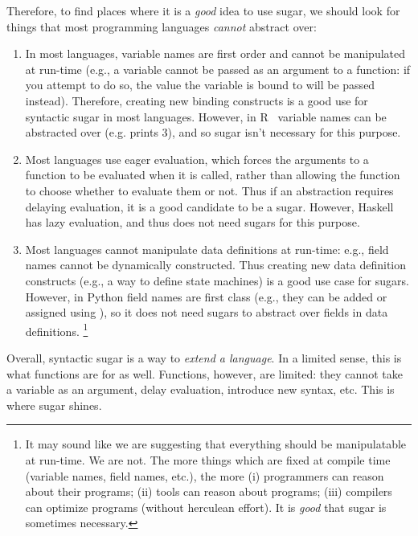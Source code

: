 Therefore, to find places where it is a \emph{good} idea to use sugar,
we should look for things that most programming languages
\emph{cannot} abstract over:
\begin{enumerate}
  \item In most languages, variable names are first order and cannot
    be manipulated at run-time (e.g., a variable cannot be passed as
    an argument to a function: if you attempt to do so, the value the
    variable is bound to will be passed instead). Therefore, creating
    new binding constructs is a good use for syntactic sugar in most
    languages. However, in R~\cite{rlang} variable names can be abstracted
    over (e.g.  prints 3), and so sugar isn't
    necessary for this purpose.
  \item Most languages use eager evaluation,
    which forces the arguments to a function to be
    evaluated when it is called, rather than allowing the function to
    choose whether to
    evaluate them or not. Thus if an abstraction requires delaying
    evaluation, it is a good candidate to be a sugar. However, Haskell
    has lazy evaluation, and thus does not need sugars for this purpose.
  \item Most languages cannot manipulate data definitions at run-time:
    e.g., field names cannot be dynamically constructed. Thus creating
    new data definition constructs (e.g., a way to define state
    machines) is a good use case for sugars. However, in Python field
    names are first class (e.g., they can be added or assigned using
    ), so it does not need sugars to abstract over fields
    in data definitions.%
    \footnote{
    It may sound like we are suggesting that everything should be
    manipulatable at run-time. We are not. The more
    things which are fixed at compile time (variable names, field
    names, etc.), the more (i) programmers can reason about their
    programs; (ii) tools can reason about programs; (iii) compilers
    can optimize programs (without herculean effort). It is
    \emph{good} that sugar is sometimes necessary.
  }
\end{enumerate}

Overall, syntactic sugar is a way to \emph{extend a language}.
In a limited sense, this is what functions are for as well.
Functions, however, are limited: they cannot take a variable as an
argument, delay evaluation, introduce new syntax, etc. This is where
sugar shines.


